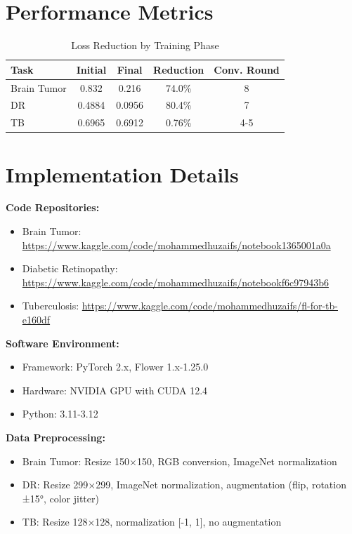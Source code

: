 \documentclass[conference]{IEEEtran}
\begin{document}
\section{Performance Metrics}

\begin{table}[!ht]
\centering
\caption{Loss Reduction by Training Phase}
\begin{tabular}{|l|c|c|c|c|}
\hline
\textbf{Task} & \textbf{Initial} & \textbf{Final} & \textbf{Reduction} & \textbf{Conv. Round} \\
\hline
Brain Tumor & 0.832 & 0.216 & 74.0\% & 8 \\
DR & 0.4884 & 0.0956 & 80.4\% & 7 \\
TB & 0.6965 & 0.6912 & 0.76\% & 4-5 \\
\hline
\end{tabular}
\end{table}

\section{Implementation Details}

\textbf{Code Repositories:}
\begin{itemize}
\item Brain Tumor: \url{https://www.kaggle.com/code/mohammedhuzaifs/notebook1365001a0a}
\item Diabetic Retinopathy: \url{https://www.kaggle.com/code/mohammedhuzaifs/notebookf6c97943b6}
\item Tuberculosis: \url{https://www.kaggle.com/code/mohammedhuzaifs/fl-for-tb-e160df}
\end{itemize}

\textbf{Software Environment:}
\begin{itemize}
\item Framework: PyTorch 2.x, Flower 1.x-1.25.0
\item Hardware: NVIDIA GPU with CUDA 12.4
\item Python: 3.11-3.12
\end{itemize}

\textbf{Data Preprocessing:}
\begin{itemize}
\item Brain Tumor: Resize 150×150, RGB conversion, ImageNet normalization
\item DR: Resize 299×299, ImageNet normalization, augmentation (flip, rotation ±15°, color jitter)
\item TB: Resize 128×128, normalization [-1, 1], no augmentation
\end{itemize}
\end{document}
